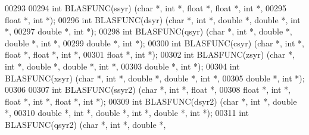 \begin{DoxyCode}
00293 
00294 \textcolor{keywordtype}{int} BLASFUNC(ssyr) (\textcolor{keywordtype}{char} *, \textcolor{keywordtype}{int} *, \textcolor{keywordtype}{float}   *, \textcolor{keywordtype}{float}  *, \textcolor{keywordtype}{int} *,
00295             \textcolor{keywordtype}{float}  *, \textcolor{keywordtype}{int} *);
00296 \textcolor{keywordtype}{int} BLASFUNC(dsyr) (\textcolor{keywordtype}{char} *, \textcolor{keywordtype}{int} *, \textcolor{keywordtype}{double}  *, \textcolor{keywordtype}{double} *, \textcolor{keywordtype}{int} *,
00297             \textcolor{keywordtype}{double} *, \textcolor{keywordtype}{int} *);
00298 \textcolor{keywordtype}{int} BLASFUNC(qsyr) (\textcolor{keywordtype}{char} *, \textcolor{keywordtype}{int} *, \textcolor{keywordtype}{double}  *, \textcolor{keywordtype}{double} *, \textcolor{keywordtype}{int} *,
00299             \textcolor{keywordtype}{double} *, \textcolor{keywordtype}{int} *);
00300 \textcolor{keywordtype}{int} BLASFUNC(csyr) (\textcolor{keywordtype}{char} *, \textcolor{keywordtype}{int} *, \textcolor{keywordtype}{float}   *, \textcolor{keywordtype}{float}  *, \textcolor{keywordtype}{int} *,
00301             \textcolor{keywordtype}{float}  *, \textcolor{keywordtype}{int} *);
00302 \textcolor{keywordtype}{int} BLASFUNC(zsyr) (\textcolor{keywordtype}{char} *, \textcolor{keywordtype}{int} *, \textcolor{keywordtype}{double}  *, \textcolor{keywordtype}{double} *, \textcolor{keywordtype}{int} *,
00303             \textcolor{keywordtype}{double} *, \textcolor{keywordtype}{int} *);
00304 \textcolor{keywordtype}{int} BLASFUNC(xsyr) (\textcolor{keywordtype}{char} *, \textcolor{keywordtype}{int} *, \textcolor{keywordtype}{double}  *, \textcolor{keywordtype}{double} *, \textcolor{keywordtype}{int} *,
00305             \textcolor{keywordtype}{double} *, \textcolor{keywordtype}{int} *);
00306 
00307 \textcolor{keywordtype}{int} BLASFUNC(ssyr2) (\textcolor{keywordtype}{char} *, \textcolor{keywordtype}{int} *, \textcolor{keywordtype}{float}   *,
00308              \textcolor{keywordtype}{float}  *, \textcolor{keywordtype}{int} *, \textcolor{keywordtype}{float}  *, \textcolor{keywordtype}{int} *, \textcolor{keywordtype}{float}  *, \textcolor{keywordtype}{int} *);
00309 \textcolor{keywordtype}{int} BLASFUNC(dsyr2) (\textcolor{keywordtype}{char} *, \textcolor{keywordtype}{int} *, \textcolor{keywordtype}{double}  *,
00310              \textcolor{keywordtype}{double} *, \textcolor{keywordtype}{int} *, \textcolor{keywordtype}{double} *, \textcolor{keywordtype}{int} *, \textcolor{keywordtype}{double} *, \textcolor{keywordtype}{int} *);
00311 \textcolor{keywordtype}{int} BLASFUNC(qsyr2) (\textcolor{keywordtype}{char} *, \textcolor{keywordtype}{int} *, \textcolor{keywordtype}{double}  *,

\end{DoxyCode}
